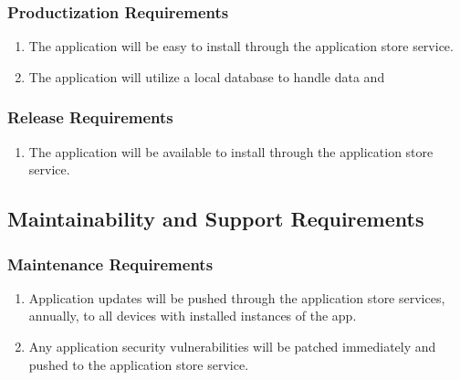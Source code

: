 \documentclass[titlepage]{article}
\newcounter{myCounter}
\begin{document}
\subsubsection{Productization Requirements}
\label{ssub:productization_requirements}
\begin{enumerate}[{OE}1. ]
    \setcounter{enumi}{\themyCounter}
	\item The application will be easy to install through the application store service.
	\item The application will utilize a local database to handle data and 
    \setcounter{myCounter}{\theenumi}
\end{enumerate}

\subsubsection{Release Requirements}
\label{ssub:release_requirements}
\begin{enumerate}[{OE}1. ]
    \setcounter{enumi}{\themyCounter}
	\item The application will be available to install through the application store service.
    \setcounter{myCounter}{\theenumi}
\end{enumerate}


\subsection{Maintainability and Support Requirements}
\label{sub:maintainability_and_support_requirements}
\setcounter{myCounter}{0}

\subsubsection{Maintenance Requirements}
\label{ssub:maintenance_requirements}
\begin{enumerate}[{MS}1. ]
    \setcounter{enumi}{\themyCounter}
    \item Application updates will be pushed through the application store services, annually, to
    all devices with installed instances of the app.
    \item Any application security vulnerabilities will be patched immediately and pushed to the
    application store service.
    \setcounter{myCounter}{\theenumi}
\end{enumerate}
\end{document}
